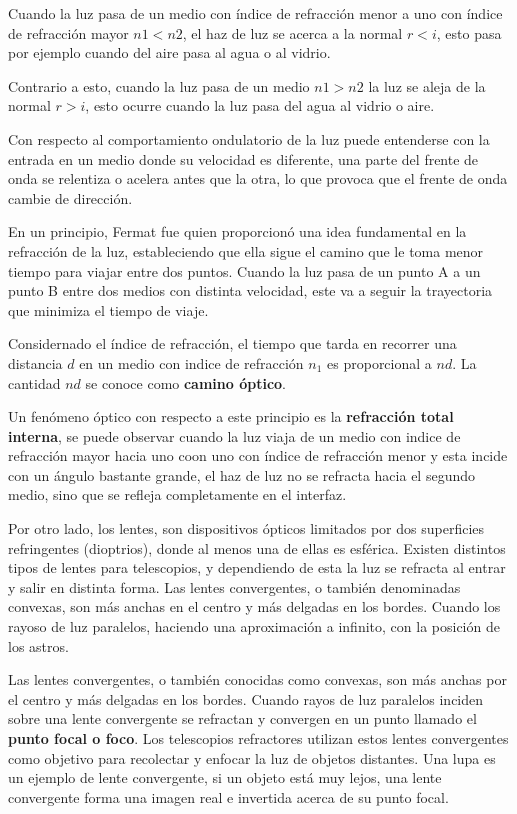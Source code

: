 Cuando la luz pasa de un medio con índice de refracción menor a uno con índice de refracción mayor $n1 < n2$, el haz de luz se acerca a la normal $r<i$, esto pasa por ejemplo cuando del aire pasa al agua o al vidrio. 

Contrario a esto, cuando la luz pasa de un medio $n1 > n2$ la luz se aleja de la normal $r > i$, esto ocurre cuando la luz pasa del agua al vidrio o aire.

Con respecto al comportamiento ondulatorio de la luz puede entenderse con la entrada en un medio donde su velocidad es diferente, una parte del frente de onda se relentiza o acelera antes que la otra, lo que provoca que el frente de onda cambie de dirección. 

En un principio, Fermat fue quien proporcionó una idea fundamental en la refracción de la luz, estableciendo que ella sigue el camino que le toma menor tiempo para viajar entre dos puntos. Cuando la luz pasa de un punto A a un punto B entre dos medios con distinta velocidad, este va a seguir la trayectoria que minimiza el tiempo de viaje. 

Considernado el índice de refracción, el tiempo que tarda en recorrer una distancia $d$ en un medio con indice de refracción $n_1$ es proporcional a $nd$. La cantidad $nd$ se conoce como \textbf{camino óptico}.

Un fenómeno óptico con respecto a este principio es la \textbf{refracción total interna}, se puede observar cuando la luz viaja de un medio con indice de refracción mayor hacia uno coon uno con índice de refracción menor y esta incide con un ángulo bastante grande, el haz de luz no se refracta hacia el segundo medio, sino que se refleja completamente en el interfaz. 


Por otro lado, los lentes, son dispositivos ópticos limitados por dos superficies refringentes (dioptrios), donde al menos una de ellas es esférica. Existen distintos tipos de lentes para telescopios, y dependiendo de esta la luz se refracta al entrar y salir en distinta forma. Las lentes convergentes, o también denominadas convexas, son más anchas en el centro y más delgadas en los bordes. Cuando los rayoso de luz paralelos, haciendo una aproximación a infinito, con la posición de los astros. 


Las lentes convergentes, o también conocidas como convexas, son más anchas por el centro y más delgadas en los bordes. Cuando rayos de luz paralelos inciden sobre una lente convergente se refractan y convergen en un punto llamado el \textbf{punto focal o foco}. Los telescopios refractores utilizan estos lentes convergentes como objetivo para recolectar y enfocar la luz de objetos distantes. Una lupa es un ejemplo de lente convergente, si un objeto está muy lejos, una lente convergente forma una imagen real e invertida acerca de su punto focal. 

